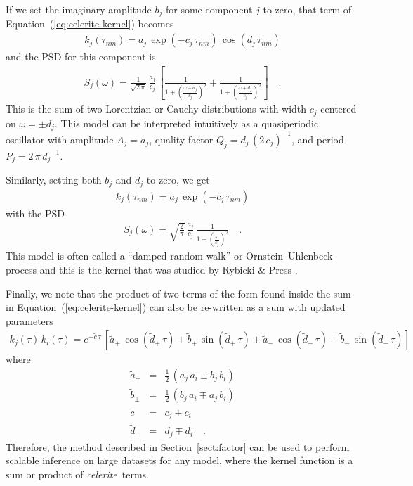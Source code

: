 \documentclass[manuscript, letterpaper]{aastex6}
\newcommand{\celeriteterm}{\emph{celerite}}
\renewcommand{\eqref}[1]{\ref{eq:#1}}
\newcommand{\Eq}[1]{Equation~(\eqref{#1})}
\newcommand{\eq}[1]{\Eq{#1}}
\newcommand{\eqlabel}[1]{\label{eq:#1}}
\newcommand{\sectionname}{Section}
\newcommand{\sectref}[1]{\ref{sect:#1}}
\newcommand{\Sect}[1]{\sectionname~\sectref{#1}}
\newcommand{\sect}[1]{\Sect{#1}}
\newcommand{\response}[1]{{#1}}
\newcommand{\responseb}[1]{{#1}}
\begin{document}
If we set the imaginary amplitude $b_j$ for some component $j$ to zero, that
term of \eq{celerite-kernel} becomes
\begin{eqnarray}
    k_j(\tau_{nm}) =
    a_j\,\exp\left(-c_j\,\tau_{nm}\right)\,\cos\left(d_j\,\tau_{nm}\right)
\end{eqnarray}
and the PSD for this component is
\begin{eqnarray}\eqlabel{lorentz-psd}
    S_j(\omega) = \frac{1}{\sqrt{2\,\pi}}\,\frac{a_j}{c_j}\,\left[
    \frac{1}{1+{\left(\frac{\omega-d_j}{c_j}\right)}^2} +
    \frac{1}{1+{\left(\frac{\omega+d_j}{c_j}\right)}^2}
    \right] \quad.
\end{eqnarray}
This is the sum of two Lorentzian or Cauchy distributions with width $c_j$
centered on $\omega = \pm d_j$.
This model can be interpreted intuitively as a quasiperiodic oscillator with
amplitude $A_j = a_j$, quality factor $Q_j = d_j\,{(2\,c_j)}^{-1}$, and period
$P_j = 2\,\pi\,{d_j}^{-1}$.

Similarly, setting both $b_j$ and $d_j$ to zero, we get
\begin{eqnarray}
    k_j(\tau_{nm}) = a_j\,\exp\left(-c_j\,\tau_{nm}\right)
\end{eqnarray}
with the PSD
\begin{eqnarray}
    S_j(\omega) = \sqrt{\frac{2}{\pi}}\,\frac{a_j}{c_j}\,
    \frac{1}{1+{\left(\frac{\omega}{c_j}\right)}^2} \quad.
\end{eqnarray}
This model is often called a \responseb{``damped random walk'' or}
Ornstein--Uhlenbeck process \response{\citep[in reference to the classic
        paper,][]{Uhlenbeck:1930}} and this is the kernel that was studied by Rybicki
\& Press \citep{Rybicki:1992,Rybicki:1995}.

Finally, we note that the product of two terms of the form found inside the
sum in \eq{celerite-kernel} can also be re-written as a sum with updated
parameters
\begin{eqnarray}\eqlabel{product-rule}
    k_j(\tau) \, k_i(\tau) =
    e^{-\tilde{c}\,\tau}\,[
            \tilde{a}_+\,\cos(\tilde{d}_+\,\tau) + \tilde{b}_+\,\sin(\tilde{d}_+\,\tau) +
            \tilde{a}_-\,\cos(\tilde{d}_-\,\tau) + \tilde{b}_-\,\sin(\tilde{d}_-\,\tau)
        ]
\end{eqnarray}
where
\begin{eqnarray}
    \tilde{a}_{\pm} &=& \frac{1}{2}\,(a_j\,a_i \pm b_j\,b_i) \\
    \tilde{b}_{\pm} &=& \frac{1}{2}\,(b_j\,a_i \mp a_j\,b_i) \\
    \tilde{c} &=& c_j + c_i \\
    \tilde{d}_{\pm} &=& d_j \mp d_i \quad.
\end{eqnarray}
Therefore, the method described in \sect{factor} can be used to
perform scalable inference on large datasets for any model, where the kernel
function is a sum or product of \celeriteterm\ terms.
\end{document}
